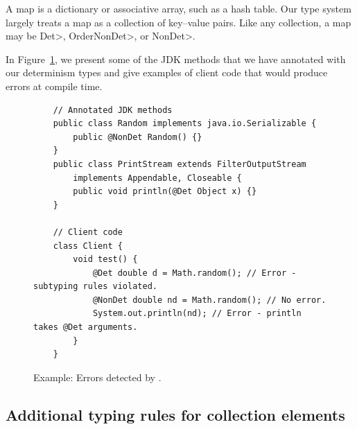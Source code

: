 A map is a dictionary or associative array, such as a hash table.
Our type system largely treats a map as a collection of key--value pairs.  Like any
collection, a map may be \<Det>, \<OrderNonDet>, or \<NonDet>.


In Figure~\ref{code-determinism}, we present some of the JDK methods that we have annotated with our determinism types and give examples of
client code that would produce errors at compile time.
\begin{figure}
    \begin{verbatim}
    // Annotated JDK methods
    public class Random implements java.io.Serializable {
        public @NonDet Random() {}
    }
    public class PrintStream extends FilterOutputStream 
        implements Appendable, Closeable {
        public void println(@Det Object x) {}
    }
    
    // Client code
    class Client {
        void test() {
            @Det double d = Math.random(); // Error - subtyping rules violated.
            @NonDet double nd = Math.random(); // No error.
            System.out.println(nd); // Error - println takes @Det arguments.
        }
    }
    \end{verbatim}
    \caption{Example: Errors detected by \theDeterminismChecker.}
    \label{code-determinism}
\end{figure}


\subsection{Additional typing rules for collection elements}\label{collection-rules}


